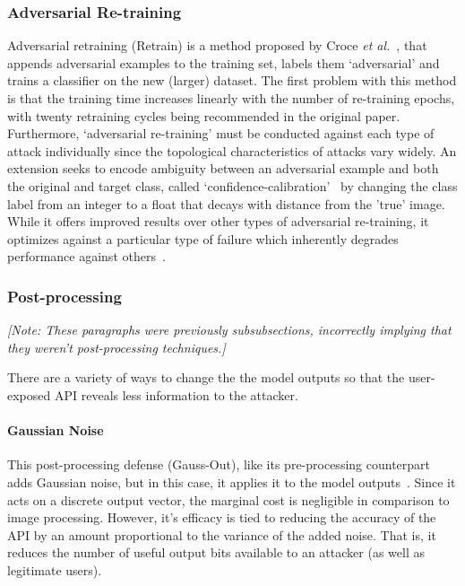 \documentclass[journal]{IEEEtran}
\newcommand{\cm}[1]{\textit{{\color{blue}#1}}}
\begin{document}
\subsubsection{Adversarial Re-training}
Adversarial retraining (Retrain) is a method proposed by Croce \textit{et al.}~\cite{tsipras_robustness_2019}, that appends adversarial examples to the training set, labels them `adversarial' and trains a classifier on the new (larger) dataset. The first problem with this method is that the training time increases linearly with the number of re-training epochs, with twenty retraining cycles being recommended in the original paper. Furthermore, `adversarial re-training' must be conducted against each type of attack individually since the topological characteristics of attacks vary widely. An extension seeks to encode ambiguity between an adversarial example and both the original and target class, called `confidence-calibration'~\cite{croce_reliable_2020} by changing the class label from an integer to a float that decays with distance from the 'true' image. While it offers improved results over other types of adversarial re-training, it optimizes against a particular type of failure which inherently degrades performance against others~\cite{carlini_towards_2017}.

\subsubsection{Post-processing}
\label{post-processing}

\cm{[Note: These paragraphs were previously subsubsections, incorrectly implying that they weren't post-processing techniques.]}


There are a variety of ways to change the the model outputs so that the user-exposed API reveals less information to the attacker.

\paragraph{Gaussian Noise}
This post-processing defense (Gauss-Out), like its pre-processing counterpart adds Gaussian noise, but in this case, it applies it to the model outputs~\cite{gauss_out}. Since it acts on a discrete output vector, the marginal cost is negligible in comparison to image processing. However, it's efficacy is tied to reducing the accuracy of the API by an amount proportional to the variance of the added noise. That is, it reduces the number of useful output bits available to an attacker (as well as legitimate users).
\end{document}
